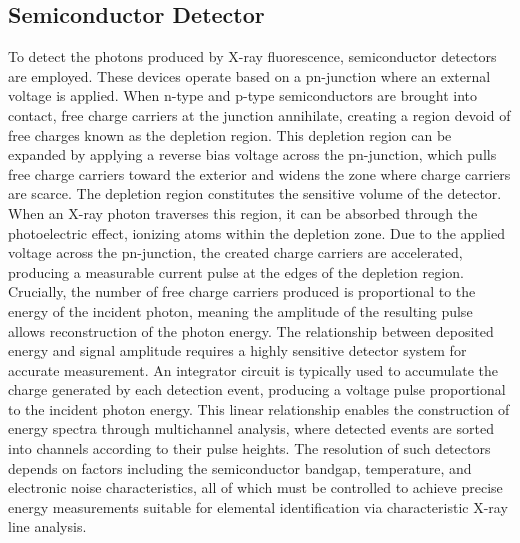 \subsection{Semiconductor Detector} \label{subsec:semiconductor_detector}
To detect the photons produced by X-ray fluorescence, semiconductor detectors are employed. These devices operate based on a pn-junction where an external voltage is applied. When n-type and p-type semiconductors are brought into contact, free charge carriers at the junction annihilate, creating a region devoid of free charges known as the depletion region. This depletion region can be expanded by applying a reverse bias voltage across the pn-junction, which pulls free charge carriers toward the exterior and widens the zone where charge carriers are scarce.
The depletion region constitutes the sensitive volume of the detector. When an X-ray photon traverses this region, it can be absorbed through the photoelectric effect, ionizing atoms within the depletion zone. Due to the applied voltage across the pn-junction, the created charge carriers are accelerated, producing a measurable current pulse at the edges of the depletion region. Crucially, the number of free charge carriers produced is proportional to the energy of the incident photon, meaning the amplitude of the resulting pulse allows reconstruction of the photon energy.
The relationship between deposited energy and signal amplitude requires a highly sensitive detector system for accurate measurement. An integrator circuit is typically used to accumulate the charge generated by each detection event, producing a voltage pulse proportional to the incident photon energy. This linear relationship enables the construction of energy spectra through multichannel analysis, where detected events are sorted into channels according to their pulse heights. The resolution of such detectors depends on factors including the semiconductor bandgap, temperature, and electronic noise characteristics, all of which must be controlled to achieve precise energy measurements suitable for elemental identification via characteristic X-ray line analysis.
